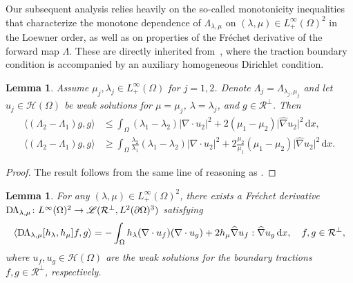 \documentclass[reqno]{amsart}
\numberwithin{equation}{section}
\numberwithin{figure}{section}
\numberwithin{table}{section}
\newcommand{\abs}[1]{\lvert#1\rvert}
\newcommand{\inner}[1]{\langle#1\rangle}
\newcommand{\di}{\mathrm{d}}
\newcommand{\DLambda}{\textup{D}\mkern-1.5mu \Lambda}
\theoremstyle{definition}
\theoremstyle{plain}
\newtheorem{lem}[thm]{Lemma}
\theoremstyle{definition}
\theoremstyle{remark}
\numberwithin{equation}{section}
\begin{document}
Our subsequent analysis relies heavily on the so-called monotonicity inequalities that characterize the monotone dependence of $\Lambda_{\lambda,\mu}$ on $(\lambda, \mu) \in L^\infty_+(\Omega)^2$ in the Loewner order, as well as on properties of the Fr\'echet derivative of the forward map $\Lambda$. These are directly inherited from~\cite{EH21}, where the traction boundary condition is accompanied by an auxiliary homogeneous Dirichlet condition.

\begin{lem} \label{lem_monotonicity_ineq1}
	Assume $\mu_j,\lambda_j \in L^\infty_+(\Omega)$ for $j=1,2$. Denote $\Lambda_j = \Lambda_{\lambda_j, \mu_j}$ and let $u_j \in \mathcal{H}(\Omega)$ be weak solutions for $\mu=\mu_j$, $\lambda= \lambda_j$, and $g\in\mathcal{R}^\perp$. Then  
	\begin{align*}  
		\inner{(\Lambda_2-\Lambda_1)g, g } &\leq \int_{\Omega} (\lambda_1-\lambda_2)\abs{\nabla\cdot u_2}^2 + 2(\mu_1-\mu_2)\abs{\widehat{\nabla}u_2}^2\, \di x, \\[1mm]  
		\inner{(\Lambda_2-\Lambda_1)g, g} &\geq \int_{\Omega} \frac{\lambda_2}{\lambda_1}(\lambda_1-\lambda_2)\abs{\nabla\cdot u_2}^2 + 2\frac{\mu_2}{\mu_1}(\mu_1-\mu_2)\abs{\widehat{\nabla}u_2}^2 \, \di x. 
	\end{align*}
\end{lem}

\begin{proof}
	The result follows from the same line of reasoning as \cite[lemmas~2.1 \& 2.2]{EH21}.
\end{proof}

\begin{lem} \label{lem_Frechet}
	For any $(\lambda, \mu) \in L^\infty_+(\Omega)^2$, there exists a Fr\'echet derivative $\DLambda_{\lambda,\mu} \colon  L^\infty(\Omega)^2 \to \mathscr{L}(\mathcal{R}^\perp, L^2(\partial \Omega)^3)$ satisfying
	\begin{equation} \label{bilinear_Frechet}
		\inner{\DLambda_{\lambda,\mu}[h_\lambda,h_\mu] f,g} = -\int_\Omega h_\lambda (\nabla \cdot u_f)(\nabla \cdot u_g) + 2 h_\mu \widehat{\nabla} u_f :\widehat{\nabla} u_g  \,\di x,  \quad f, g \in \mathcal{R}^\perp,
	\end{equation}
	where $u_f, u_g \in \mathcal{H}(\Omega)$ are the weak solutions for the boundary tractions $f, g \in \mathcal{R}^\perp$, respectively.
\end{lem}
\end{document}
